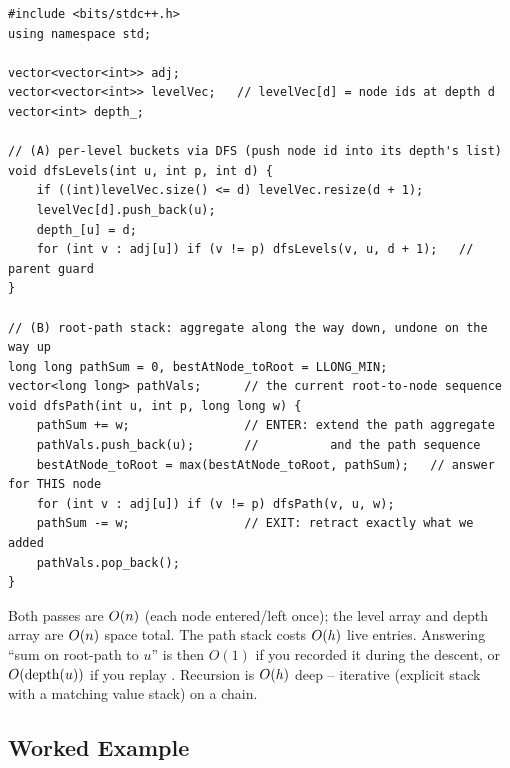 \begin{lstlisting}[caption={DFS carrying a root-path stack, and a DFS/BFS filling a level array}, label={lst:c24-path-stack}]
#include <bits/stdc++.h>
using namespace std;

vector<vector<int>> adj;
vector<vector<int>> levelVec;   // levelVec[d] = node ids at depth d
vector<int> depth_;

// (A) per-level buckets via DFS (push node id into its depth's list)
void dfsLevels(int u, int p, int d) {
    if ((int)levelVec.size() <= d) levelVec.resize(d + 1);
    levelVec[d].push_back(u);
    depth_[u] = d;
    for (int v : adj[u]) if (v != p) dfsLevels(v, u, d + 1);   // parent guard
}

// (B) root-path stack: aggregate along the way down, undone on the way up
long long pathSum = 0, bestAtNode_toRoot = LLONG_MIN;
vector<long long> pathVals;      // the current root-to-node sequence
void dfsPath(int u, int p, long long w) {
    pathSum += w;                // ENTER: extend the path aggregate
    pathVals.push_back(u);       //          and the path sequence
    bestAtNode_toRoot = max(bestAtNode_toRoot, pathSum);   // answer for THIS node
    for (int v : adj[u]) if (v != p) dfsPath(v, u, w);
    pathSum -= w;                // EXIT: retract exactly what we added
    pathVals.pop_back();
}
\end{lstlisting}
\begin{complexitybox}
Both passes are $O(n)$ (each node entered/left once); the level array and depth array
are $O(n)$ space total. The path stack costs $O(h)$ live entries. Answering ``sum on
root-path to $u$'' is then $O(1)$ if you recorded it during the descent, or $O(\operatorname{depth}(u))$
if you replay . Recursion is $O(h)$ deep -- iterative (explicit stack with
a matching value stack) on a chain.
\end{complexitybox}

\subsection{Worked Example}

